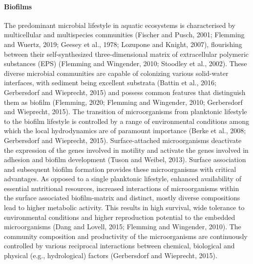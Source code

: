 \paragraph {Biofilms}
The predominant microbial lifestyle in aquatic ecosystems is characterised by multicellular and multispecies communities (Fischer and Pusch, 2001; Flemming and Wuertz, 2019; Geesey et al., 1978; Lozupone and Knight, 2007), flourishing between their self-synthesized three-dimensional matrix of extracellular polymeric substances (EPS) (Flemming and Wingender, 2010; Stoodley et al., 2002). These diverse microbial communities are capable of colonizing various solid-water interfaces, with sediment being excellent substrata (Battin et al., 2016; Gerbersdorf and Wieprecht, 2015) and possess common features that distinguish them as biofilm (Flemming, 2020; Flemming and Wingender, 2010; Gerbersdorf and Wieprecht, 2015). The transition of microorganisms from planktonic lifestyle to the biofilm lifestyle is controlled by a range of environmental conditions among which the local hydrodynamics are of paramount importance (Berke et al., 2008; Gerbersdorf and Wieprecht, 2015). Surface-attached microorganisms deactivate the expression of the genes involved in motility and activate the genes involved in adhesion and biofilm development (Tuson and Weibel, 2013). Surface association and subsequent biofilm formation provides these microorganisms with critical advantages. As opposed to a single planktonic lifestyle, enhanced availability of essential nutritional resources, increased interactions of microorganisms within the surface associated biofilm-matrix and distinct, mostly diverse compositions lead to higher metabolic activity. This results in high survival, wide tolerance to environmental conditions and higher reproduction potential to the embedded microorganisms (Dang and Lovell, 2015; Flemming and Wingender, 2010). The community composition and productivity of the microorganisms are continuously controlled by various reciprocal interactions between chemical, biological and physical (e.g., hydrological) factors (Gerbersdorf and Wieprecht, 2015).

